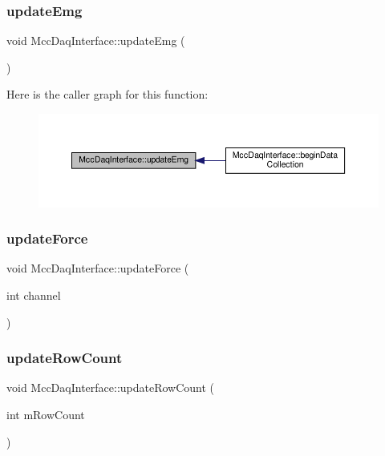 \subsubsection{\texorpdfstring{update\+Emg}{updateEmg}}
{\footnotesize\ttfamily void Mcc\+Daq\+Interface\+::update\+Emg (\begin{DoxyParamCaption}{ }\end{DoxyParamCaption})\hspace{0.3cm}{\ttfamily [signal]}}

Here is the caller graph for this function\+:
\nopagebreak
\begin{figure}[H]
\begin{center}
\leavevmode
\includegraphics[width=350pt]{class_mcc_daq_interface_a66f961728aca729d4a93930d695b6cb9_icgraph}
\end{center}
\end{figure}
\mbox{\label{class_mcc_daq_interface_ac56b39d573200c4fe2f5b5935405fd6f}} 
\subsubsection{\texorpdfstring{update\+Force}{updateForce}}
{\footnotesize\ttfamily void Mcc\+Daq\+Interface\+::update\+Force (\begin{DoxyParamCaption}\item[{int}]{channel }\end{DoxyParamCaption})\hspace{0.3cm}{\ttfamily [signal]}}

\mbox{\label{class_mcc_daq_interface_ac8075afce0aa1f4fc95a9fba13ac60ef}} 
\subsubsection{\texorpdfstring{update\+Row\+Count}{updateRowCount}}
{\footnotesize\ttfamily void Mcc\+Daq\+Interface\+::update\+Row\+Count (\begin{DoxyParamCaption}\item[{int}]{m\+Row\+Count }\end{DoxyParamCaption})\hspace{0.3cm}{\ttfamily [signal]}}



